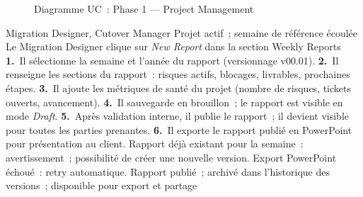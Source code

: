 \begin{figure}[H]
\centering
{}
\caption{Diagramme UC~: Phase 1 — Project Management}
\label{fig:uc-phase1}
\end{figure}

  {Migration Designer, Cutover Manager}
  {Projet actif~; semaine de référence écoulée}
  {Le Migration Designer clique sur \textit{New Report} dans la section Weekly Reports}
  {\textbf{1.}~Il sélectionne la semaine et l'année du rapport (versionnage v00.01).\newline
   \textbf{2.}~Il renseigne les sections du rapport~: risques actifs, blocages, livrables, prochaines étapes.\newline
   \textbf{3.}~Il ajoute les métriques de santé du projet (nombre de risques, tickets ouverts, avancement).\newline
   \textbf{4.}~Il sauvegarde en brouillon~; le rapport est visible en mode \textit{Draft}.\newline
   \textbf{5.}~Après validation interne, il publie le rapport~; il devient visible pour toutes les parties prenantes.\newline
   \textbf{6.}~Il exporte le rapport publié en PowerPoint pour présentation au client.}
  {Rapport déjà existant pour la semaine~: avertissement~; possibilité de créer une nouvelle version. Export PowerPoint échoué~: retry automatique.}
  {Rapport publié~; archivé dans l'historique des versions~; disponible pour export et partage}

